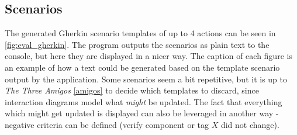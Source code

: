 \subsection{Scenarios}
The generated Gherkin scenario templates of up to 4 actions can be seen in \ref{fig:eval_gherkin}. The program outputs the scenarios as plain text to the console, but here they are displayed in a nicer way. The caption of each figure is an example of how a text could be generated based on the template scenario output by the application. Some scenarios seem a bit repetitive, but it is up to \textit{The Three Amigos} \ref{amigos} to decide which templates to discard, since interaction diagrams model what \textit{might} be updated. The fact that everything which might get updated is displayed can also be leveraged in another way - negative criteria can be defined (verify component or tag $X$ did not change).
